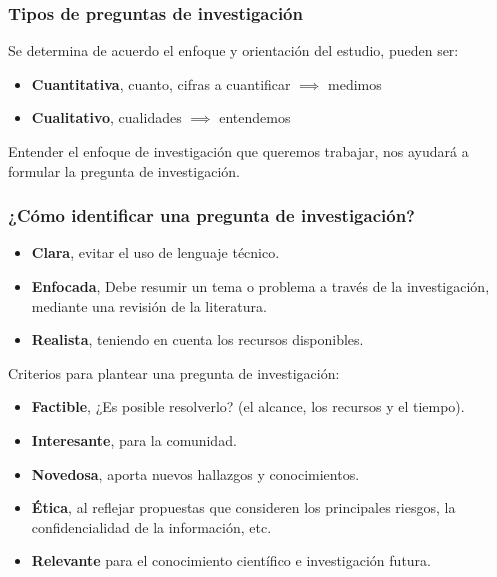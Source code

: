 \documentclass[
	11pt, %
]{beamer}
\begin{document}
\begin{frame}
  \frametitle{Tipos de preguntas de investigación}
  \bigskip %
  Se determina de acuerdo el enfoque y orientación del estudio, pueden ser:
  \bigskip %
  \begin{itemize}
  \item \textbf{Cuantitativa}, cuanto, cifras a cuantificar $\implies$ medimos
  \item \textbf{Cualitativo}, cualidades $\implies$ entendemos 
  \end{itemize}
  \bigskip %
  Entender el enfoque de investigación que queremos trabajar, nos ayudará a formular la pregunta de investigación.
  
\end{frame}

\begin{frame}
  \frametitle{¿Cómo identificar una pregunta de investigación?}
  \begin{itemize}
  \item \textbf{Clara}, evitar el uso de lenguaje técnico.
  \item \textbf{Enfocada}, Debe resumir un tema o problema a través de la investigación, mediante una revisión de la literatura.
  \item \textbf{Realista}, teniendo en cuenta los recursos disponibles.
  \end{itemize}
  
\end{frame}

\begin{frame}
  Criterios para plantear una pregunta de investigación:\\
  \bigskip %
  \begin{itemize}
  \item \textbf{Factible}, ¿Es posible resolverlo? (el alcance, los recursos y el tiempo).
  \item \textbf{Interesante}, para la comunidad.
  \item \textbf{Novedosa}, aporta nuevos hallazgos y conocimientos.
  \item \textbf{Ética}, al reflejar propuestas que consideren los principales riesgos, la confidencialidad de la información, etc.
  \item \textbf{Relevante} para el conocimiento científico e investigación futura.
  \end{itemize}

\end{frame}
\end{document}

